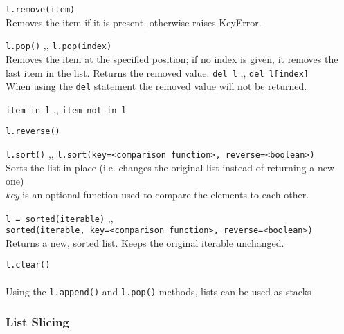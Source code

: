 \begin{itemize}
       \texttt{l.remove(item)} \\
      Removes the item if it is present, otherwise raises KeyError.

      \begin{itemize}
           \texttt{l.pop()} \sep{,}
          \texttt{l.pop(index)} \\
          Removes the item at the specified position; if no index is given, it removes the last item
          in the list. Returns the removed value.
           \texttt{del l} \sep{,}
          \texttt{del l[index]} \\
          When using the \texttt{del} statement the removed value will not be returned.
      \end{itemize}
      

       \texttt{item in l} \sep{,}
      \texttt{item not in l}

       \texttt{l.reverse()}

       \texttt{l.sort()} \sep{,}
      \texttt{l.sort(key=<comparison function>, reverse=<boolean>)} \\
      Sorts the list in place (i.e. changes the original list instead of returning a new one)\\
      \textit{key} is an optional function used to compare the elements to each other.

       \texttt{l = sorted(iterable)} \sep{,} \\
      \texttt{sorted(iterable, key=<comparison function>, reverse=<boolean>)} \\
      Returns a new, sorted list. Keeps the original iterable unchanged. 

       \texttt{l.clear()}
      \\ \\
      Using the \texttt{l.append()} and \texttt{l.pop()} methods, lists
      can be used as stacks

    \end{itemize}

    \subsubsection{List Slicing} \label{List Slicing}

